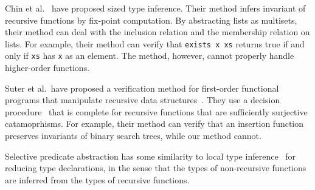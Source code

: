 Chin et al.~\cite{Chin2003} have proposed sized type inference.  Their
method infers invariant of recursive functions by fix-point computation.
By abstracting lists as multisets, their method can deal with the
inclusion relation and the membership relation on lists.  For example, their method
can verify that \texttt{exists x xs} returns true if and only if
\texttt{xs} has \texttt{x} as an element.  The method, however, cannot
properly handle higher-order functions.

Suter et al.~have proposed a verification method for first-order
functional programs that manipulate recursive data
structures~\cite{Suter2011}.  They use a decision
procedure~\cite{Suter2010} that is complete for recursive functions that
are sufficiently surjective catamoprhisms.  For example, their method
can verify that an insertion function preserves invariants of binary
search trees, while our method cannot.

Selective predicate abstraction has some similarity to local type
inference~\cite{Pierce2000} for reducing type declarations, in the sense
that the types of non-recursive functions are inferred from the types of
recursive functions.
